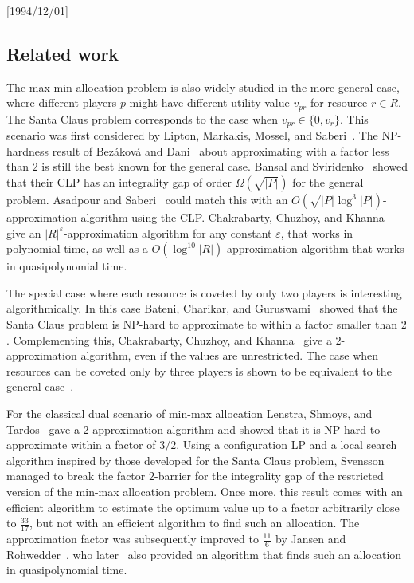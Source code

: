 \NeedsTeXFormat{LaTeX2e}[1994/12/01]\documentclass[letterpaper, 11pt]{article}
\theoremstyle{definition}
\theoremstyle{remark}
\numberwithin{equation}{section}
\begin{document}
\subsection{Related work}
The max-min allocation problem is also widely studied in the more general
case, where different players $p$ might have different utility value
$v_{pr}$ for resource $r\in R$. The Santa Claus problem corresponds to
the case when $v_{pr} \in \{ 0, v_r\}$.
This scenario was first considered by Lipton, Markakis, Mossel, and
Saberi~\cite{liptmarkmosssabe}. 
The NP-hardness result of Bez\'akov\'a and Dani~\cite{bezakovadani} about approximating
with a factor less than $2$ is still the best known for the general case.
Bansal and Sviridenko~\cite{bansalsviridenko} showed that their CLP
has an integrality gap of order $\Omega (\sqrt{|P|})$ for the general
problem. Asadpour and Saberi~\cite{asadpoursaberi} could match this
with an $O(\sqrt{|P|} \log^3 |P|)$-approximation algorithm using the CLP.
Chakrabarty, Chuzhoy, and Khanna~\cite{chakchuzkhan} 
give an $|R|^{\varepsilon}$-approximation algorithm for any constant
$\varepsilon$, that works in polynomial time, as well as a $O(\log^{10}
|R|)$-approximation algorithm that works in quasipolynomial time. 

The special case where each resource is coveted by only two
players is interesting algorithmically. In this case
Bateni, Charikar, and Guruswami~\cite{batenicharikarguruswami} 
showed that the Santa Claus problem is NP-hard to approximate to within a
factor smaller than $2$. Complementing this, Chakrabarty, Chuzhoy, and
Khanna~\cite{chakchuzkhan} give a $2$-approximation
algorithm, even if the values are unrestricted. 
The case when resources can be coveted only by three players is shown to be
equivalent to the general case~\cite{batenicharikarguruswami}.

For the classical dual scenario of min-max allocation
Lenstra, Shmoys, and Tardos~\cite{lenstrashmoystardos} gave a 2-approximation algorithm and
showed that it is NP-hard to approximate within a factor of $3/2$.
Using a configuration LP and a local search algorithm inspired by
those developed for the Santa Claus problem,
Svensson~\cite{svensson-minmax}
managed to break the factor $2$-barrier for the integrality
gap of the restricted version of the min-max allocation problem. 
Once more, this result comes with an efficient algorithm
to estimate the optimum value up to a factor arbitrarily
close to $\frac{33}{17}$,
but not with an efficient algorithm to find such an allocation.
The approximation factor was subsequently improved to $\frac{11}{6}$
by Jansen and Rohwedder~\cite{JR-11/6}, who
later~\cite{JR-quasi} also provided an algorithm that finds
such an allocation in quasipolynomial time. 
\end{document}
